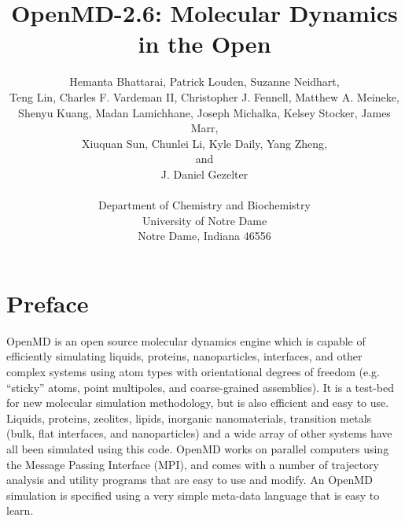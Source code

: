 \documentclass[]{book}
\begin{document}





\title{{\sc OpenMD-2.6}: Molecular Dynamics in the Open}

\author{Hemanta Bhattarai, Patrick Louden, Suzanne
  Neidhart, \\
  Teng Lin, Charles F. Vardeman II, Christopher J. Fennell, Matthew
  A. Meineke, \\ Shenyu Kuang, Madan Lamichhane, Joseph Michalka, 
  Kelsey Stocker, James Marr, \\ Xiuquan Sun,
  Chunlei Li,  Kyle Daily, Yang Zheng, \\ and \\
  J. Daniel Gezelter \\ \\
  Department of Chemistry and Biochemistry\\
  University of Notre Dame\\
  Notre Dame, Indiana 46556}

\maketitle

\section*{Preface} 

{\sc OpenMD} is an open source molecular dynamics engine which is
capable of efficiently simulating liquids, proteins, nanoparticles,
interfaces, and other complex systems using atom types with
orientational degrees of freedom (e.g. ``sticky'' atoms, point
multipoles, and coarse-grained assemblies). It is a test-bed for new
molecular simulation methodology, but is also efficient and easy to
use.  Liquids, proteins, zeolites, lipids, inorganic nanomaterials,
transition metals (bulk, flat interfaces, and nanoparticles) and a
wide array of other systems have all been simulated using this
code. {\sc OpenMD} works on parallel computers using the Message
Passing Interface (MPI), and comes with a number of trajectory
analysis and utility programs that are easy to use and modify. An
OpenMD simulation is specified using a very simple meta-data language
that is easy to learn.
\end{document}

